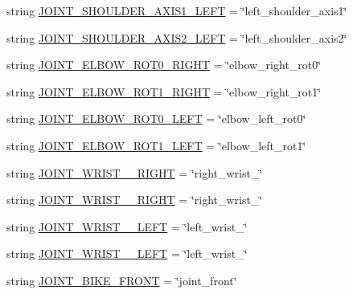 \begin{DoxyCompactItemize}
\item 
string \mbox{\hyperlink{namespacesteering__simulation_a613bf71b0e0c3452f92b4853e2e62220}{J\+O\+I\+N\+T\+\_\+\+S\+H\+O\+U\+L\+D\+E\+R\+\_\+\+A\+X\+I\+S1\+\_\+\+L\+E\+FT}} = \char`\"{}left\+\_\+shoulder\+\_\+axis1\char`\"{}
\item 
string \mbox{\hyperlink{namespacesteering__simulation_ad9da62cd2eb0c4000d1fc4eda6017364}{J\+O\+I\+N\+T\+\_\+\+S\+H\+O\+U\+L\+D\+E\+R\+\_\+\+A\+X\+I\+S2\+\_\+\+L\+E\+FT}} = \char`\"{}left\+\_\+shoulder\+\_\+axis2\char`\"{}
\item 
string \mbox{\hyperlink{namespacesteering__simulation_a87ec11ba1fc1588a0cd2cc310e9dd12d}{J\+O\+I\+N\+T\+\_\+\+E\+L\+B\+O\+W\+\_\+\+R\+O\+T0\+\_\+\+R\+I\+G\+HT}} = \char`\"{}elbow\+\_\+right\+\_\+rot0\char`\"{}
\item 
string \mbox{\hyperlink{namespacesteering__simulation_a1a8aae1f17bde6bb8d80c73e7f546434}{J\+O\+I\+N\+T\+\_\+\+E\+L\+B\+O\+W\+\_\+\+R\+O\+T1\+\_\+\+R\+I\+G\+HT}} = \char`\"{}elbow\+\_\+right\+\_\+rot1\char`\"{}
\item 
string \mbox{\hyperlink{namespacesteering__simulation_a6bc051ea14ae98684ec54faf12a80d18}{J\+O\+I\+N\+T\+\_\+\+E\+L\+B\+O\+W\+\_\+\+R\+O\+T0\+\_\+\+L\+E\+FT}} = \char`\"{}elbow\+\_\+left\+\_\+rot0\char`\"{}
\item 
string \mbox{\hyperlink{namespacesteering__simulation_a95ae3d26f956b491229c78d10dee1aba}{J\+O\+I\+N\+T\+\_\+\+E\+L\+B\+O\+W\+\_\+\+R\+O\+T1\+\_\+\+L\+E\+FT}} = \char`\"{}elbow\+\_\+left\+\_\+rot1\char`\"{}
\item 
string \mbox{\hyperlink{namespacesteering__simulation_a97c26a57b04116975fbd66982ffe0477}{J\+O\+I\+N\+T\+\_\+\+W\+R\+I\+S\+T\+\_\+\_\+\+R\+I\+G\+HT}} = \char`\"{}right\+\_\+wrist\+\_\char`\"{}
\item 
string \mbox{\hyperlink{namespacesteering__simulation_a1ff71de09a5b70901b4321e8cf68d061}{J\+O\+I\+N\+T\+\_\+\+W\+R\+I\+S\+T\+\_\+\_\+\+R\+I\+G\+HT}} = \char`\"{}right\+\_\+wrist\+\_\char`\"{}
\item 
string \mbox{\hyperlink{namespacesteering__simulation_a1292b9f1429c017d07ec3de6b2f0a7bf}{J\+O\+I\+N\+T\+\_\+\+W\+R\+I\+S\+T\+\_\+\_\+\+L\+E\+FT}} = \char`\"{}left\+\_\+wrist\+\_\char`\"{}
\item 
string \mbox{\hyperlink{namespacesteering__simulation_a0032de0d6332a1ae30dee3b30019d5f8}{J\+O\+I\+N\+T\+\_\+\+W\+R\+I\+S\+T\+\_\+\_\+\+L\+E\+FT}} = \char`\"{}left\+\_\+wrist\+\_\char`\"{}
\item 
string \mbox{\hyperlink{namespacesteering__simulation_a745b702c18a3c9c7ec661d2255a662c6}{J\+O\+I\+N\+T\+\_\+\+B\+I\+K\+E\+\_\+\+F\+R\+O\+NT}} = \char`\"{}joint\+\_\+front\char`\"{}

\end{DoxyCompactItemize}
